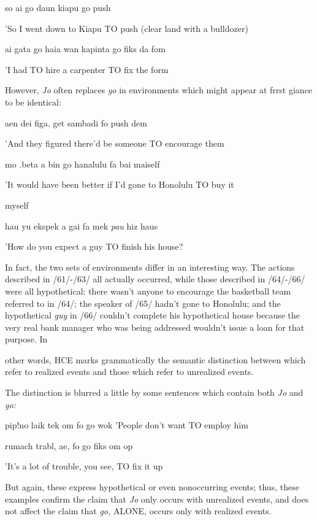 \ea\label{ex:62}
 so ai go daun kiapu go push
\glt
\z

'So I went down to Kiapu TO push (clear land with a bulldozer)

\ea\label{ex:63}
 ai gata go haia wan kapinta go fiks da fom
\glt
\z

'I had TO hire a carpenter TO fix the form

However, \textit{Jo }often replaces \textit{go} in environments which might appear at frrst giance to be identical:

\ea\label{ex:64}
 aen dei figa, get sambadi fo push dem
\glt
\z

'And they figured there'd be someone TO encourage them

\ea\label{ex:65}
 mo .beta a bin go hanalulu fa bai maiself
\glt
\z

'It would have been better if I'd gone to Honolulu TO buy it

myself

\ea\label{ex:66}
 hau yu ekspek a gai fa mek \textit{pau }hiz haus
\glt
\z

'How do you expect a guy TO finish his house?

In fact, the two sets of environments differ in an interesting way. The actions described in /61/-/63/ all actually occurred, while those de\-scribed in /64/-/66/ were all hypothetical: there wasn't anyone to encourage the basketball team referred to in /64/; the speaker of /65/ hadn't gone to Honolulu; and the hypothetical \textit{guy} in /66/ couldn't complete his hypothetical house because the very real bank manager who was being addressed wouldn't issue a loan for that purpose. In



other words, HCE marks grammatically the semantic distinction be\-tween   which refer to realized events and those which refer to unrealized events.

The distinction is blurred a little by some sentences which contain both \textit{Jo} and \textit{go:}

\ea\label{ex:67}
 pip!no laik tek om fo go wok 'People don't want TO employ him
\glt
\z

\ea\label{ex:68}
 rumach trabl, ae, fo go fiks om op
\glt
\z

'It's a lot of trouble, you see, TO fix it up

But again, these  express hypothetical or even nonoccur\-ring events; thus, these examples confirm the claim that \textit{Jo} only occurs with unrealized events, and does not affect the claim that \textit{go,} ALONE, occurs only with realized events.

